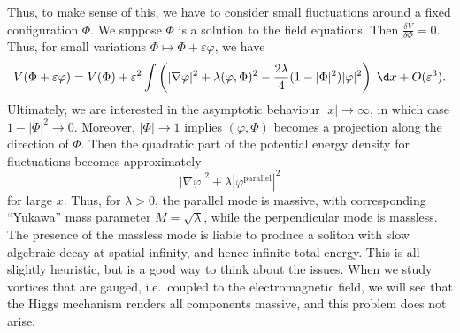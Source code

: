 \documentclass[a4paper]{article}
\begin{document}
Thus, to make sense of this, we have to consider small fluctuations around a fixed configuration $\Phi$. We suppose $\Phi$ is a solution to the field equations. Then $\frac{\delta V}{\delta \Phi} = 0$. Thus, for small variations $\Phi \mapsto \Phi + \varepsilon \varphi$, we have
\[
  V(\Phi + \varepsilon \varphi) = V(\Phi) + \varepsilon^2 \int \left(|\nabla \varphi|^2 + \lambda (\varphi, \Phi)^2 - \frac{2\lambda}{4}(1 - |\Phi|^2)|\varphi|^2\right) \;\d x + O(\varepsilon^3).
\]
Ultimately, we are interested in the asymptotic behaviour $|x| \to \infty$, in which case $1 - |\Phi|^2 \to 0$. Moreover, $|\Phi| \to 1$ implies $(\varphi, \Phi)$ becomes a projection along the direction of $\Phi$. Then the quadratic part of the potential energy density for fluctuations becomes approximately
\[
  |\nabla \varphi|^2 + \lambda |\varphi^{\mathrm{parallel}}|^2
\]
for large $x$. Thus, for $\lambda > 0$, the parallel mode is massive, with corresponding ``Yukawa'' mass parameter $M = \sqrt{\lambda}$, while the perpendicular mode is massless. The presence of the massless mode is liable to produce a soliton with slow algebraic decay at spatial infinity, and hence infinite total energy. This is all slightly heuristic, but is a good way to think about the issues. When we study vortices that are gauged, i.e.\ coupled to the electromagnetic field, we will see that the Higgs mechanism renders all components massive, and this problem does not arise.
\end{document}

